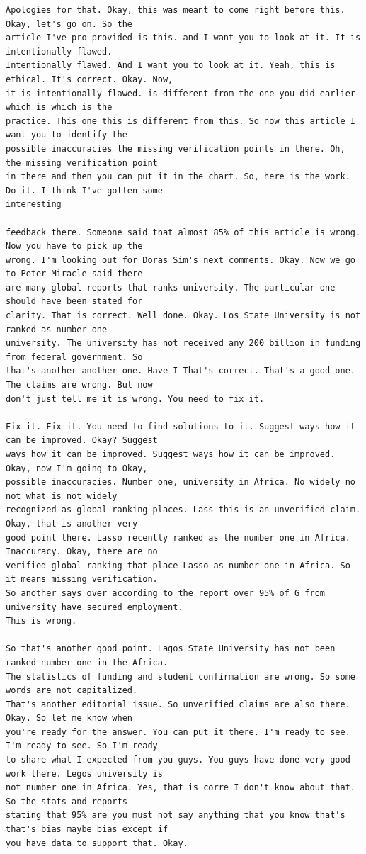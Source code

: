 {\begin{Verbatim}
Apologies for that. Okay, this was meant to come right before this. Okay, let's go on. So the
article I've pro provided is this. and I want you to look at it. It is intentionally flawed.
Intentionally flawed. And I want you to look at it. Yeah, this is ethical. It's correct. Okay. Now,
it is intentionally flawed. is different from the one you did earlier which is which is the
practice. This one this is different from this. So now this article I want you to identify the
possible inaccuracies the missing verification points in there. Oh, the missing verification point
in there and then you can put it in the chart. So, here is the work. Do it. I think I've gotten some
interesting

feedback there. Someone said that almost 85% of this article is wrong. Now you have to pick up the
wrong. I'm looking out for Doras Sim's next comments. Okay. Now we go to Peter Miracle said there
are many global reports that ranks university. The particular one should have been stated for
clarity. That is correct. Well done. Okay. Los State University is not ranked as number one
university. The university has not received any 200 billion in funding from federal government. So
that's another another one. Have I That's correct. That's a good one. The claims are wrong. But now
don't just tell me it is wrong. You need to fix it.

Fix it. Fix it. You need to find solutions to it. Suggest ways how it can be improved. Okay? Suggest
ways how it can be improved. Suggest ways how it can be improved. Okay, now I'm going to Okay,
possible inaccuracies. Number one, university in Africa. No widely no not what is not widely
recognized as global ranking places. Lass this is an unverified claim. Okay, that is another very
good point there. Lasso recently ranked as the number one in Africa. Inaccuracy. Okay, there are no
verified global ranking that place Lasso as number one in Africa. So it means missing verification.
So another says over according to the report over 95% of G from university have secured employment.
This is wrong.

So that's another good point. Lagos State University has not been ranked number one in the Africa.
The statistics of funding and student confirmation are wrong. So some words are not capitalized.
That's another editorial issue. So unverified claims are also there. Okay. So let me know when
you're ready for the answer. You can put it there. I'm ready to see. I'm ready to see. So I'm ready
to share what I expected from you guys. You guys have done very good work there. Legos university is
not number one in Africa. Yes, that is corre I don't know about that. So the stats and reports
stating that 95% are you must not say anything that you know that's that's bias maybe bias except if
you have data to support that. Okay.


\end{Verbatim}}
